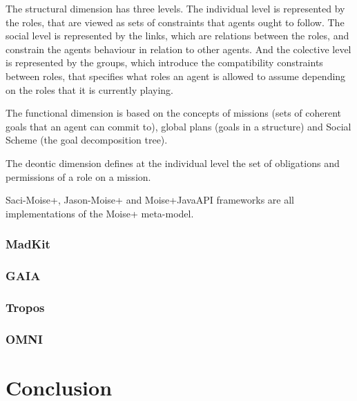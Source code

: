 \documentclass{article}
\begin{document}
The structural dimension has three levels. The individual level is
represented by the roles, that are viewed as sets of constraints
that agents ought to follow. The social level is represented by the
links, which are relations between the roles, and constrain the
agents behaviour in relation to other agents. And the colective level
is represented by the groups, which introduce the compatibility
constraints between roles, that specifies what roles an agent is
allowed to assume depending on the roles that it is currently playing.

The functional dimension is based on the concepts of missions (sets of
coherent goals that an agent can commit to), global plans (goals in a
structure) and Social Scheme (the goal decomposition tree).

The deontic dimension defines at the individual level the set of
obligations and permissions of a role on a mission.

Saci-Moise+, Jason-Moise+ and Moise+JavaAPI frameworks are all
implementations of the Moise+ meta-model.

\subsubsection{MadKit}
\subsubsection{GAIA}
\subsubsection{Tropos}
\subsubsection{OMNI}

\section{Conclusion}



\end{document}
